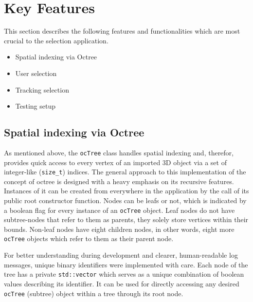 \section{Key Features}
\label{sec:key_features}
This section describes the following features and functionalities which are most crucial to the selection application.

\begin{itemize}  
	\item Spatial indexing via Octree
	\item User selection
	\item Tracking selection
	\item Testing setup 
\end{itemize}

\subsection{Spatial indexing via Octree}
\label{sec:spatial_indexing_via_octree}

As mentioned above, the \texttt{ocTree} class handles spatial indexing and, therefor, provides quick access to every vertex of an imported 3D object via a set of integer-like (\texttt{size\_t}) indices. The general approach to this implementation of the concept of octree is designed with a heavy emphasis on its recursive features. Instances of it can be created from everywhere in the application by the call of its public root constructor function. Nodes can be leafs or not, which is indicated by a boolean flag for every instance of an \texttt{ocTree} object. Leaf nodes do not have subtree-nodes that refer to them as parents, they solely store vertices within their bounds. Non-leaf nodes have eight children nodes, in other words, eight more \texttt{ocTree} objects which refer to them as their parent node.

For better understanding during development and clearer, human-readable log messages, unique binary identifiers were implemented with care. Each node of the tree has a private \texttt{std::vector} which serves as a unique combination of boolean values describing its identifier. It can be used for directly accessing any desired \texttt{ocTree} (subtree) object within a tree through its root node.

